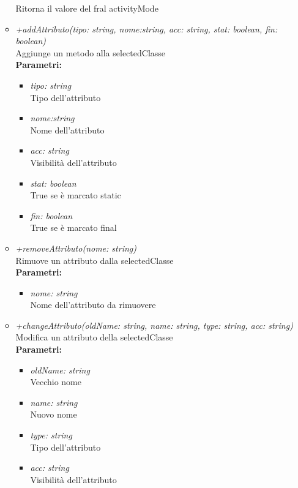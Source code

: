 \begin{itemize}
\begin{itemize}
    		Ritorna il valore del fral activityMode
    		\item \emph{+addAttributo(tipo: string, nome:string, acc: string, stat: boolean, fin: boolean)}\\
    		Aggiunge un metodo alla selectedClasse\\
    		\textbf{Parametri:}
    		\begin{itemize}
    			\item \emph{tipo: string}\\
    			Tipo dell'attributo
    			\item \emph{nome:string}\\
    			Nome dell'attributo
    			\item \emph{acc: string}\\
    			Visibilità dell'attributo
    			\item \emph{stat: boolean}\\
    			True se è marcato static
    			\item \emph{fin: boolean}\\
    			True se è marcato final
    		\end{itemize}
    		\item \emph{+removeAttributo(nome: string)}\\
    		Rimuove un attributo dalla selectedClasse\\
    		\textbf{Parametri:}
    		\begin{itemize}
    			\item \emph{nome: string}\\
    			Nome dell'attributo da rimuovere
    		\end{itemize}
    		\item \emph{+changeAttributo(oldName: string, name: string, type: string, acc: string)}\\
    		Modifica un attributo della selectedClasse\\
    		\textbf{Parametri:}
    		\begin{itemize}
    			\item \emph{oldName: string}\\
    			Vecchio nome
    			\item \emph{name: string}\\
    			Nuovo nome
    			\item \emph{type: string}\\
    			Tipo dell'attributo
    			\item \emph{acc: string}\\
    			Visibilità dell'attributo

\end{itemize}
\end{itemize}
\end{itemize}
